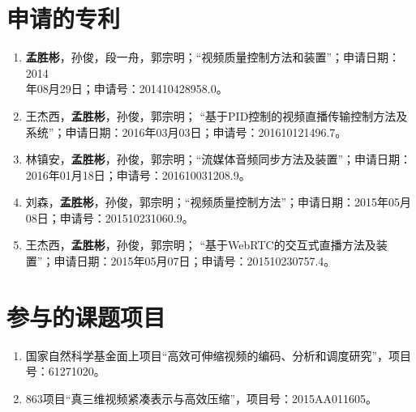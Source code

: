 \section*{申请的专利}
\begin{enumerate}
	\item \textbf{孟胜彬}，孙俊，段一舟，郭宗明；“视频质量控制方法和装置”；申请日期：2014\\年08月29日；申请号：201410428958.0。
	\item 王杰西，\textbf{孟胜彬}，孙俊，郭宗明； “基于PID控制的视频直播传输控制方法及系统”；申请日期：2016年03月03日；申请号：201610121496.7。
	\item 林镇安，\textbf{孟胜彬}，孙俊，郭宗明；“流媒体音频同步方法及装置”；申请日期：2016年01月18日；申请号：201610031208.9。
	\item 刘森，\textbf{孟胜彬}，孙俊，郭宗明；“视频质量控制方法”；申请日期：2015年05月08日；申请号：201510231060.9。
	\item 王杰西，\textbf{孟胜彬}，孙俊，郭宗明； “基于WebRTC的交互式直播方法及装置”；申请日期：2015年05月07日；申请号：201510230757.4。
\end{enumerate}

\section*{参与的课题项目}
\begin{enumerate}
	\item 国家自然科学基金面上项目“高效可伸缩视频的编码、分析和调度研究”，项目号：61271020。
	\item 863项目“真三维视频紧凑表示与高效压缩”，项目号：2015AA011605。
\end{enumerate}